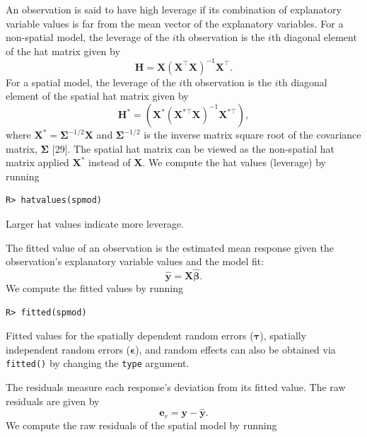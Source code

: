 \documentclass[10pt,letterpaper]{article}
\begin{document}
An observation is said to have high leverage if its combination of
explanatory variable values is far from the mean vector of the
explanatory variables. For a non-spatial model, the leverage of the
\(i\)th observation is the \(i\)th diagonal element of the hat matrix
given by \begin{equation*}
  \mathbf{H} = \mathbf{X}(\mathbf{X}^\top\mathbf{X})^{-1}\mathbf{X}^\top .
\end{equation*} For a spatial model, the leverage of the \(i\)th
observation is the \(i\)th diagonal element of the spatial hat matrix
given by \begin{equation*}
  \mathbf{H}^* = (\mathbf{X}^* (\mathbf{X}^{* \top} \mathbf{X})^{-1} \mathbf{X}^{* \top}) ,
\end{equation*} where
\(\mathbf{X}^* = \boldsymbol{\Sigma}^{-1/2}\mathbf{X}\) and
\(\boldsymbol{\Sigma}^{-1/2}\) is the inverse matrix square root of the
covariance matrix, \(\boldsymbol{\Sigma}\) {[}29{]}. The spatial hat
matrix can be viewed as the non-spatial hat matrix applied
\(\mathbf{X}^*\) instead of \(\mathbf{X}\). We compute the hat values
(leverage) by running

\begin{verbatim}
R> hatvalues(spmod)
\end{verbatim}

Larger hat values indicate more leverage.

The fitted value of an observation is the estimated mean response given
the observation's explanatory variable values and the model fit:
\begin{equation*}
  \hat{\mathbf{y}} = \mathbf{X} \hat{\boldsymbol{\beta}}.
\end{equation*} We compute the fitted values by running

\begin{verbatim}
R> fitted(spmod)
\end{verbatim}

Fitted values for the spatially dependent random errors
(\(\boldsymbol{\tau}\)), spatially independent random errors
(\(\boldsymbol{\epsilon}\)), and random effects can also be obtained via
\texttt{fitted()} by changing the \texttt{type} argument.

The residuals measure each response's deviation from its fitted value.
The raw residuals are given by \begin{equation*}
  \mathbf{e}_{r} = \mathbf{y} - \hat{\mathbf{y}}.
\end{equation*} We compute the raw residuals of the spatial model by
running
\end{document}

